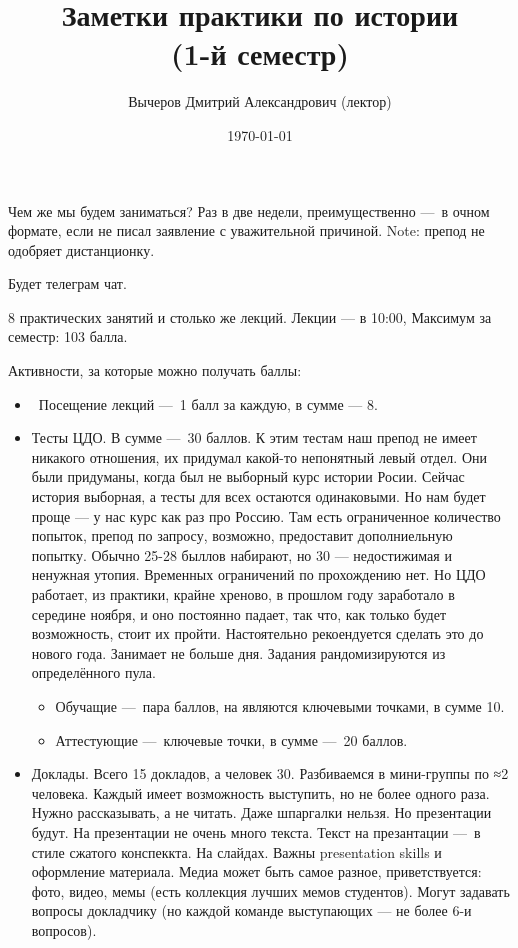 \documentclass[12pt, a4paper]{article}
\title{Заметки практики по истории \\(1-й семестр)}
\author{
  \vova
  \and
  {Вычеров Дмитрий Александрович (лектор)}
}
\date{\today}
\begin{document}
  \tittoc

    Чем же мы будем заниматься?
    Раз в две недели, преимущественно — в очном формате, если не писал заявление с уважительной причиной.
    Note: препод не одобряет дистанционку.

    Будет телеграм чат.

    8 практических занятий и столько же лекций.
    Лекции — в 10:00, 
    Максимум за семестр: 103 балла.

    Активности, за которые можно получать баллы:

    \begin{itemize}
        \item \ Посещение лекций — 1 балл за каждую, в сумме — 8.
        \item Тесты ЦДО. В сумме — 30 баллов. К этим тестам наш препод не имеет никакого отношения, их придумал какой-то непонятный левый отдел.
        Они были придуманы, когда был не выборный курс истории Росии. Сейчас история выборная, а тесты для всех остаются одинаковыми. Но нам будет проще — у нас курс как раз про Россию.
        Там есть ограниченное количество попыток, препод по запросу, возможно, предоставит дополниельную попытку. Обычно 25-28 быллов набирают, но 30 — недостижимая и ненужная утопия. Временных ограничений по прохождению нет. 
        Но ЦДО работает, из практики, крайне хреново, в прошлом году заработало в середине ноября, и оно постоянно падает, 
        так что, как только будет возможность, стоит их пройти. Настоятельно рекоендуется сделать это до нового года. Занимает не больше дня.
        Задания рандомизируются из определённого пула.
        \begin{itemize}
            \item Обучащие — пара баллов, на являются ключевыми точками, в сумме 10.
            \item Аттестующие — ключевые точки, в сумме — 20 баллов.
        \end{itemize}
        \item Доклады. Всего 15 докладов, а человек 30. 
        Разбиваемся в мини-группы по ≈2 человека. Каждый имеет возможность выступить, но не более одного раза.
        Нужно рассказывать, а не читать. Даже шпаргалки нельзя. Но презентации будут. На презентации не очень много текста.
        Текст на презантации — в стиле сжатого конспеккта. На слайдах. Важны presentation skills и оформление материала.
        Медиа может быть самое разное, приветствуется: фото, видео, мемы (есть коллекция лучших мемов студентов). 
        Могут задавать вопросы докладчику (но каждой команде выступающих — не более 6-и вопросов).

\end{itemize}
\end{document}
